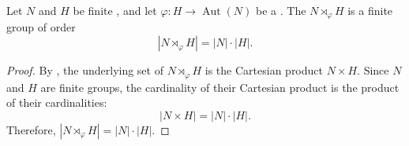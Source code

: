 \begin{proposition} \label{proposition:order_of_semidirect_product_of_finite_groups}
    Let $N$ and $H$ be finite , and let $\varphi: H \to \operatorname{Aut}(N)$ be a . The  $N \rtimes_\varphi H$ is a finite group of order
    $$|N \rtimes_\varphi H| = |N| \cdot |H|.$$
\end{proposition}

\begin{proof}
    By , the underlying set of $N \rtimes_\varphi H$ is the Cartesian product $N \times H$. Since $N$ and $H$ are finite groups, the cardinality of their Cartesian product is the product of their cardinalities:
    $$|N \times H| = |N| \cdot |H|.$$
    Therefore, $|N \rtimes_\varphi H| = |N| \cdot |H|$.
\end{proof}

